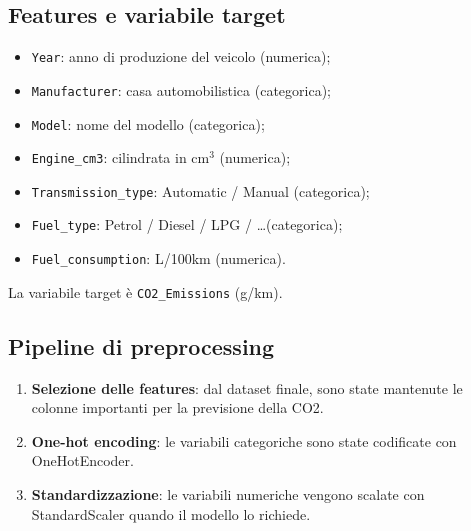 \documentclass[a4paper,12pt]{report}
\begin{document}
	\subsection{Features e variabile target}
	\begin{itemize}
		\item \texttt{Year}: anno di produzione del veicolo (numerica);
		\item \texttt{Manufacturer}: casa automobilistica (categorica);
		\item \texttt{Model}: nome del modello (categorica);
		\item \texttt{Engine\_cm3}: cilindrata in \(\mathrm{cm^3}\) (numerica);
		\item \texttt{Transmission\_type}: Automatic / Manual (categorica);
		\item \texttt{Fuel\_type}: Petrol / Diesel / LPG / \ldots (categorica);
		\item \texttt{Fuel\_consumption}: L/100km (numerica).
	\end{itemize}
	La variabile target è \texttt{CO2\_Emissions} (g/km).
	
	\subsection{Pipeline di preprocessing}
	\begin{enumerate}
		\item \textbf{Selezione delle features}: dal dataset finale, sono state mantenute le colonne importanti per la previsione della CO2.
		\item \textbf{One-hot encoding}: le variabili categoriche sono state codificate con OneHotEncoder.
		\item \textbf{Standardizzazione}: le variabili numeriche vengono scalate con StandardScaler quando il modello lo richiede.
	\end{enumerate}
	
\end{document}
